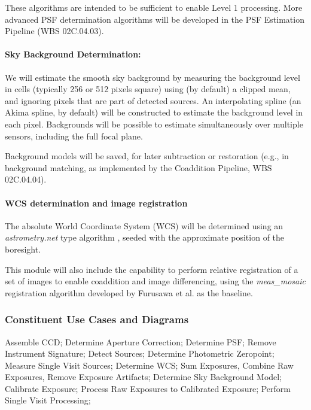 \documentclass[12pt]{article}
\newcommand{\wbsPSF}{WBS 02C.04.03}
\newcommand{\wbsCoadd}{WBS 02C.04.04}
\begin{document}
These algorithms are intended to be sufficient to enable Level 1 processing. More advanced PSF determination algorithms will be developed in the PSF Estimation Pipeline (\wbsPSF).

\paragraph{Sky Background Determination:}

We will estimate the smooth sky background by measuring the background level in cells (typically 256 or 512 pixels square) %
using (by default) a clipped mean, and ignoring pixels that are part of detected sources.  An interpolating spline (an Akima spline, by default) will be constructed to estimate the background level in each pixel. Backgrounds will be possible to estimate simultaneously over multiple sensors, including the full focal plane.

Background models will be saved, for later subtraction or restoration (e.g., in background matching, as implemented by the Coaddition Pipeline, \wbsCoadd).

\paragraph{WCS determination and image registration}

The absolute World Coordinate System (WCS) will be determined using an {\em astrometry.net} type algorithm \cite{Lang09}, seeded with the approximate position of the boresight.  %

This module will also include the capability to perform relative registration of a set of images to enable coaddition and image differencing, using the {\em meas\_mosaic} registration algorithm developed by Furusawa et al. \cite{Furusawa14} as the baseline.

\subsubsection{Constituent Use Cases and Diagrams}

Assemble CCD; Determine Aperture Correction; Determine PSF; Remove Instrument Signature; Detect Sources; Determine Photometric Zeropoint; Measure Single Visit Sources; Determine WCS; Sum Exposures, Combine Raw Exposures, Remove Exposure Artifacts; Determine Sky Background Model; Calibrate Exposure; Process Raw Exposures to Calibrated Exposure; Perform Single Visit Processing;
\end{document}
